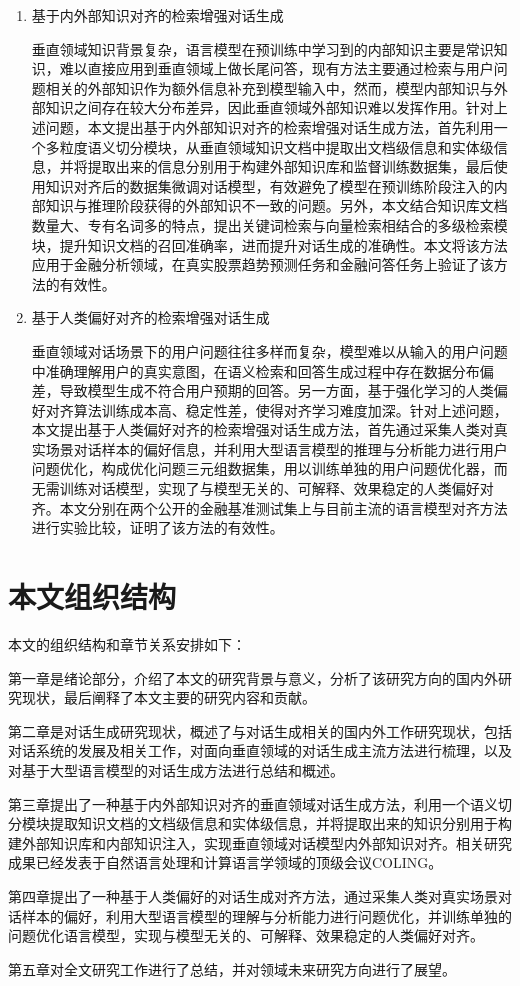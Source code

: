 \begin{enumerate}[topsep = 0 pt, itemsep= 0 pt, parsep=0pt, partopsep=0pt, leftmargin=0pt, itemindent=44pt, labelsep=6pt, listparindent=24pt, label=\arabic*)]
	\item 基于内外部知识对齐的检索增强对话生成
	
	垂直领域知识背景复杂，语言模型在预训练中学习到的内部知识主要是常识知识，难以直接应用到垂直领域上做长尾问答，现有方法主要通过检索与用户问题相关的外部知识作为额外信息补充到模型输入中，然而，模型内部知识与外部知识之间存在较大分布差异，因此垂直领域外部知识难以发挥作用。针对上述问题，本文提出基于内外部知识对齐的检索增强对话生成方法，首先利用一个多粒度语义切分模块，从垂直领域知识文档中提取出文档级信息和实体级信息，并将提取出来的信息分别用于构建外部知识库和监督训练数据集，最后使用知识对齐后的数据集微调对话模型，有效避免了模型在预训练阶段注入的内部知识与推理阶段获得的外部知识不一致的问题。另外，本文结合知识库文档数量大、专有名词多的特点，提出关键词检索与向量检索相结合的多级检索模块，提升知识文档的召回准确率，进而提升对话生成的准确性。本文将该方法应用于金融分析领域，在真实股票趋势预测任务和金融问答任务上验证了该方法的有效性。

	\item 基于人类偏好对齐的检索增强对话生成
	
	垂直领域对话场景下的用户问题往往多样而复杂，模型难以从输入的用户问题中准确理解用户的真实意图，在语义检索和回答生成过程中存在数据分布偏差，导致模型生成不符合用户预期的回答。另一方面，基于强化学习的人类偏好对齐算法训练成本高、稳定性差，使得对齐学习难度加深。针对上述问题，本文提出基于人类偏好对齐的检索增强对话生成方法，首先通过采集人类对真实场景对话样本的偏好信息，并利用大型语言模型的推理与分析能力进行用户问题优化，构成优化问题三元组数据集，用以训练单独的用户问题优化器，而无需训练对话模型，实现了与模型无关的、可解释、效果稳定的人类偏好对齐。本文分别在两个公开的金融基准测试集上与目前主流的语言模型对齐方法进行实验比较，证明了该方法的有效性。
\end{enumerate}

\section{本文组织结构}

本文的组织结构和章节关系安排如下：

第一章是绪论部分，介绍了本文的研究背景与意义，分析了该研究方向的国内外研究现状，最后阐释了本文主要的研究内容和贡献。

第二章是对话生成研究现状，概述了与对话生成相关的国内外工作研究现状，包括对话系统的发展及相关工作，对面向垂直领域的对话生成主流方法进行梳理，以及对基于大型语言模型的对话生成方法进行总结和概述。

第三章提出了一种基于内外部知识对齐的垂直领域对话生成方法，利用一个语义切分模块提取知识文档的文档级信息和实体级信息，并将提取出来的知识分别用于构建外部知识库和内部知识注入，实现垂直领域对话模型内外部知识对齐。相关研究成果已经发表于自然语言处理和计算语言学领域的顶级会议COLING。

第四章提出了一种基于人类偏好的对话生成对齐方法，通过采集人类对真实场景对话样本的偏好，利用大型语言模型的理解与分析能力进行问题优化，并训练单独的问题优化语言模型，实现与模型无关的、可解释、效果稳定的人类偏好对齐。

第五章对全文研究工作进行了总结，并对领域未来研究方向进行了展望。
